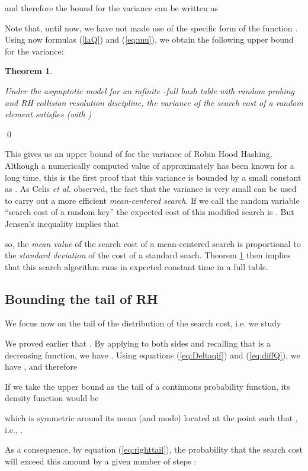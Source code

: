 \documentclass[proceedings]{aofa}
\newtheorem{theorem}{Theorem}
\begin{document}
and therefore the bound for the variance can be written as
 

Note that, until now, we have not made use of the specific form of the function .
Using now formulas (\ref{laQ}) and (\ref{eq:mu}), we obtain the following upper bound for the variance:
\begin{theorem}\label{theorem:boundRH}

Under the asymptotic model for an infinite -full hash table with random
probing and RH collision resolution discipline, the variance of the search cost
of a random element satisfies (with )

\end{theorem}
\qed

This gives us an upper bound of  for the variance of Robin Hood Hashing.
Although a numerically computed value of approximately  has been known for a long time, this is the first proof that this variance is bounded by a small constant as .
As Celis {\em et al.} observed, the fact that the variance is very small can be used to carry out a more efficient {\em mean-centered search}. If we call  the random variable
``search cost of a random key''
the expected cost of this modified 
search is 
. But Jensen's inequality implies that


so, the {\em mean value} of the search cost of a mean-centered search is proportional to the {\em standard deviation} of the cost of a standard seach.
Theorem
\ref{theorem:boundRH} then implies that this search
algorithm runs in expected constant time in a full table.

\subsection{Bounding the tail of RH}

We focus now on the tail of the distribution of the search cost, i.e. we study

We proved earlier that . By applying  to both 
sides and recalling that  is a decreasing function, we have
.
Using equations (\ref{eq:Deltaqif}) and (\ref{eq:diffQ}), we have
,
and therefore

If we take the upper bound as the tail  of a continuous probability function, its density function would be

which is symmetric around its mean (and mode) located at the point  such that , i.e., .

As a consequence, by equation (\ref{eq:righttail}), the probability that the search cost will exceed this amount by a given number of steps :
\end{document}
